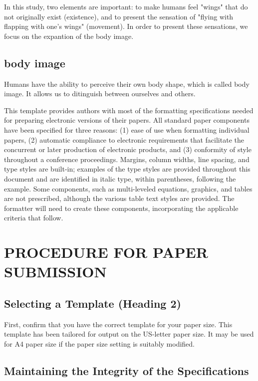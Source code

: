 \documentclass[letterpaper, 10 pt, conference]{ieeeconf}  %
\begin{document}
        In this study, two elements are important: to make humans feel "wings" that do not originally exist (existence), and to present the sensation of "flying with flapping with one's wings" (movement).  
        In order to present these sensations, we focus on the expantion of the body image.  

        \subsection{body image}
                Humans have the ability to perceive their own body shape, which is called body image.  
                It allows us to ditinguish between ourselves and others.


                


This template provides authors with most of the formatting specifications needed for preparing electronic versions of their papers. All standard paper components have been specified for three reasons: (1) ease of use when formatting individual papers, (2) automatic compliance to electronic requirements that facilitate the concurrent or later production of electronic products, and (3) conformity of style throughout a conference proceedings. Margins, column widths, line spacing, and type styles are built-in; examples of the type styles are provided throughout this document and are identified in italic type, within parentheses, following the example. Some components, such as multi-leveled equations, graphics, and tables are not prescribed, although the various table text styles are provided. The formatter will need to create these components, incorporating the applicable criteria that follow.

\section{PROCEDURE FOR PAPER SUBMISSION}

\subsection{Selecting a Template (Heading 2)}

First, confirm that you have the correct template for your paper size. This template has been tailored for output on the US-letter paper size. 
It may be used for A4 paper size if the paper size setting is suitably modified.

\subsection{Maintaining the Integrity of the Specifications}
\end{document}
